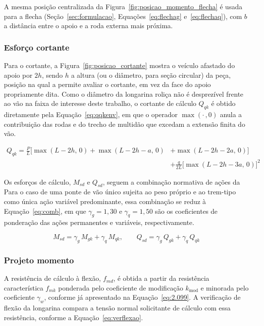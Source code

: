 A mesma posição centralizada da Figura~\ref{fig:posicao_momento_flecha} é usada para a flecha (Seção~\ref{sec:formulacao}, Equações~\eqref{eq:flechag} e~\eqref{eq:flechaq}), com $b$ a distância entre o apoio e a roda externa mais próxima.

\subsubsection*{Esforço cortante}

Para o cortante, a Figura~\ref{fig:posicao_cortante} mostra o veículo afastado do apoio por $2h$, sendo $h$ a altura (ou o diâmetro, para seção circular) da peça, posição na qual a \textcite{NBR7190-1:2022} permite avaliar o cortante, em vez da face do apoio propriamente dita.
Como o diâmetro da longarina roliça não é desprezível frente ao vão na faixa de interesse deste trabalho, o cortante de cálculo $Q_{qk}$ é obtido diretamente pela Equação~\eqref{eq:qqkenv}, em que o operador $\max(\cdot\,,0)$ anula a contribuição das rodas e do trecho de multidão que excedam a extensão finita do vão.

\begin{equation}
\begin{split}
Q_{qk} = \frac{P}{L}\Big[\max(L-2h,\,0) + \max(L-2h-a,\,0) &+ \max(L-2h-2a,\,0)\Big] \\
&+ \frac{q}{2L}\Big[\max(L-2h-3a,\,0)\Big]^{2}
\end{split}
\label{eq:qqkenv}
\end{equation}

Os esforços de cálculo, $M_{sd}$ e $Q_{sd}$, seguem a combinação normativa de ações da \textcite{NBR8681:2025}
Para o caso de uma ponte de vão único sujeita ao peso próprio e ao trem-tipo como única ação variável predominante, essa combinação se reduz à Equação~\eqref{eq:comb}, em que $\gamma_g = 1{,}30$ e $\gamma_q = 1{,}50$ são os coeficientes de ponderação das ações permanentes e variáveis, respectivamente.

\begin{equation}
M_{sd} = \gamma_g\,M_{gk} + \gamma_q\,M_{qk}, \qquad Q_{sd} = \gamma_g\,Q_{gk} + \gamma_q\,Q_{qk}
\label{eq:comb}
\end{equation}

\subsubsection{Projeto momento}

A resistência de cálculo à flexão, $f_{md}$, é obtida a partir da resistência característica $f_{mk}$ ponderada pelo coeficiente de modificação $k_{\mathrm{mod}}$ e minorada pelo coeficiente $\gamma_w$, conforme já apresentado na Equação~\eqref{eq:2.099}.
A verificação de flexão da longarina compara a tensão normal solicitante de cálculo com essa resistência, conforme a Equação~\eqref{eq:verflexao}.

